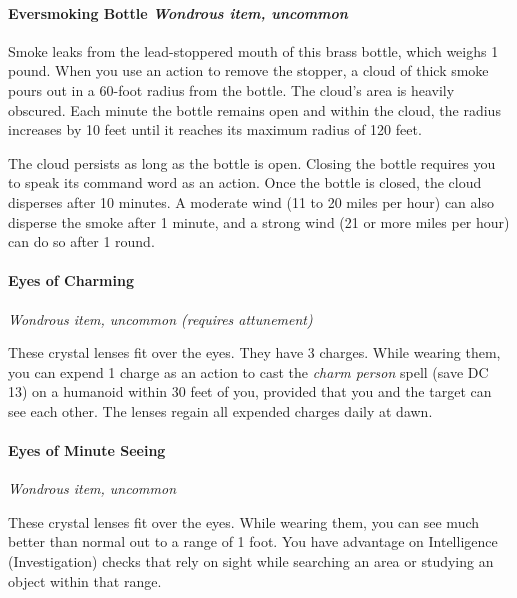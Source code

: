 \documentclass[
]{article}
\begin{document}
\hypertarget{eversmoking-bottle-wondrous-item-uncommon}{%
\paragraph{\texorpdfstring{Eversmoking Bottle \emph{Wondrous item,
uncommon}}{Eversmoking Bottle Wondrous item, uncommon}}\label{eversmoking-bottle-wondrous-item-uncommon}}

Smoke leaks from the lead-stoppered mouth of this brass bottle, which
weighs 1 pound. When you use an action to remove the stopper, a cloud of
thick smoke pours out in a 60-foot radius from the bottle. The cloud's
area is heavily obscured. Each minute the bottle remains open and within
the cloud, the radius increases by 10 feet until it reaches its maximum
radius of 120 feet.

The cloud persists as long as the bottle is open. Closing the bottle
requires you to speak its command word as an action. Once the bottle is
closed, the cloud disperses after 10 minutes. A moderate wind (11 to 20
miles per hour) can also disperse the smoke after 1 minute, and a strong
wind (21 or more miles per hour) can do so after 1 round.

\hypertarget{eyes-of-charming}{%
\paragraph{Eyes of Charming}\label{eyes-of-charming}}

\emph{Wondrous item, uncommon (requires attunement)}

These crystal lenses fit over the eyes. They have 3 charges. While
wearing them, you can expend 1 charge as an action to cast the
\emph{charm person} spell (save DC 13) on a humanoid within 30 feet of
you, provided that you and the target can see each other. The lenses
regain all expended charges daily at dawn.

\hypertarget{eyes-of-minute-seeing}{%
\paragraph{Eyes of Minute Seeing}\label{eyes-of-minute-seeing}}

\emph{Wondrous item, uncommon}

These crystal lenses fit over the eyes. While wearing them, you can see
much better than normal out to a range of 1 foot. You have advantage on
Intelligence (Investigation) checks that rely on sight while searching
an area or studying an object within that range.
\end{document}
